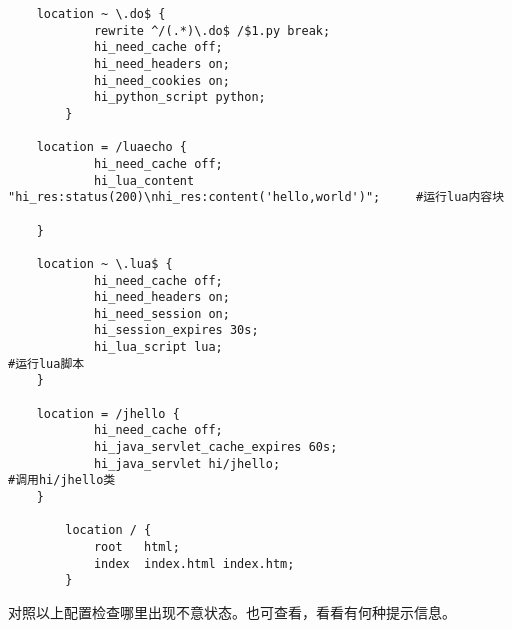 \begin{lstlisting}
	location ~ \.do$ {
            rewrite ^/(.*)\.do$ /$1.py break;
            hi_need_cache off;
            hi_need_headers on;
            hi_need_cookies on;
            hi_python_script python;
        }

	location = /luaecho {
            hi_need_cache off;
            hi_lua_content "hi_res:status(200)\nhi_res:content('hello,world')";		#运行lua内容块
	
	}

	location ~ \.lua$ {
            hi_need_cache off;
            hi_need_headers on;
            hi_need_session on;
            hi_session_expires 30s;
            hi_lua_script lua;													#运行lua脚本
	}
	
	location = /jhello {
            hi_need_cache off;
            hi_java_servlet_cache_expires 60s;
            hi_java_servlet hi/jhello;											#调用hi/jhello类
	}

        location / {
            root   html;
            index  index.html index.htm;
        }
\end{lstlisting}
对照以上配置检查哪里出现不意状态。也可查看，看看有何种提示信息。








